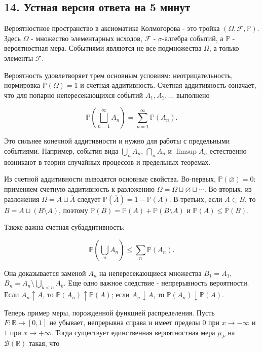 \documentclass[
  11pt,
  a4paper,
]{article}
\begin{document}
\subsection{14. Устная версия ответа на 5
минут}\label{ux443ux441ux442ux43dux430ux44f-ux432ux435ux440ux441ux438ux44f-ux43eux442ux432ux435ux442ux430-ux43dux430-5-ux43cux438ux43dux443ux442}

Вероятностное пространство в аксиоматике Колмогорова - это тройка
\((\Omega,\mathcal F,\mathbb P)\). Здесь \(\Omega\) - множество
элементарных исходов, \(\mathcal F\) - \(\sigma\)-алгебра событий, а
\(\mathbb P\) - вероятностная мера. Событиями являются не все
подмножества \(\Omega\), а только элементы \(\mathcal F\).

Вероятность удовлетворяет трем основным условиям: неотрицательность,
нормировка \(\mathbb P(\Omega)=1\) и счетная аддитивность. Счетная
аддитивность означает, что для попарно непересекающихся событий
\(A_1,A_2,\ldots\) выполнено

\[
\mathbb P\left(\bigsqcup_{n=1}^{\infty}A_n\right)
=
\sum_{n=1}^{\infty}\mathbb P(A_n).
\]

Это сильнее конечной аддитивности и нужно для работы с предельными
событиями. Например, события вида \(\bigcup_n A_n\), \(\bigcap_n A_n\) и
\(\limsup A_n\) естественно возникают в теории случайных процессов и
предельных теоремах.

Из счетной аддитивности выводятся основные свойства. Во-первых,
\(\mathbb P(\varnothing)=0\): применяем счетную аддитивность к
разложению \(\Omega=\Omega\sqcup\varnothing\sqcup\cdots\). Во-вторых, из
разложения \(\Omega=A\sqcup \overline{A}\) следует
\(\mathbb P(\overline{A})=1-\mathbb P(A)\). В-третьих, если
\(A\subset B\), то \(B=A\sqcup(B\setminus A)\), поэтому
\(\mathbb P(B)=\mathbb P(A)+\mathbb P(B\setminus A)\) и
\(\mathbb P(A)\le\mathbb P(B)\).

Также важна счетная субаддитивность:

\[
\mathbb P\left(\bigcup_n A_n\right)\le\sum_n\mathbb P(A_n).
\]

Она доказывается заменой \(A_n\) на непересекающиеся множества
\(B_1=A_1\), \(B_n=A_n\setminus\bigcup_{k<n}A_k\). Еще одно важное
следствие - непрерывность вероятности. Если \(A_n\uparrow A\), то
\(\mathbb P(A_n)\uparrow\mathbb P(A)\); если \(A_n\downarrow A\), то
\(\mathbb P(A_n)\downarrow\mathbb P(A)\).

Теперь пример меры, порожденной функцией распределения. Пусть
\(F:\mathbb R\to[0,1]\) не убывает, непрерывна справа и имеет пределы
\(0\) при \(x\to-\infty\) и \(1\) при \(x\to+\infty\). Тогда существует
единственная вероятностная мера \(\mu_F\) на \(\mathcal B(\mathbb R)\)
такая, что
\end{document}
